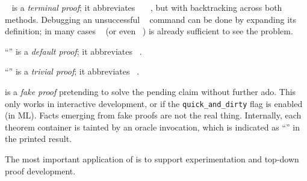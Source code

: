 \begin{isabellebody}
\begin{isamarkuptext}
\begin{description}
  \item \hyperlink{command.by}{\mbox{}}~ is a \emph{terminal
  proof}; it abbreviates \hyperlink{command.proof}{\mbox{}}~~~, but with
  backtracking across both methods.  Debugging an unsuccessful
  \hyperlink{command.by}{\mbox{}}~ command can be done by expanding its
  definition; in many cases \hyperlink{command.proof}{\mbox{}}~ (or even
  ~) is already sufficient to see the
  problem.

  \item ``\hyperlink{command.ddot}{\mbox{\isa{\isacommand{{\isachardot}{\isachardot}}}}}'' is a \emph{default
  proof}; it abbreviates \hyperlink{command.by}{\mbox{}}~.

  \item ``\hyperlink{command.dot}{\mbox{\isa{\isacommand{{\isachardot}}}}}'' is a \emph{trivial
  proof}; it abbreviates \hyperlink{command.by}{\mbox{}}~.
  
  \item \hyperlink{command.sorry}{\mbox{}} is a \emph{fake proof}
  pretending to solve the pending claim without further ado.  This
  only works in interactive development, or if the \verb|quick_and_dirty| flag is enabled (in ML).  Facts emerging from fake
  proofs are not the real thing.  Internally, each theorem container
  is tainted by an oracle invocation, which is indicated as ``\isa{{\isachardoublequote}{\isacharbrackleft}{\isacharbang}{\isacharbrackright}{\isachardoublequote}}'' in the printed result.
  
  The most important application of \hyperlink{command.sorry}{\mbox{}} is to support
  experimentation and top-down proof development.


\end{description}
\end{isamarkuptext}
\end{isabellebody}
